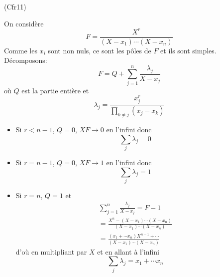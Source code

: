 \begin{tiny}(Cfr11)\end{tiny} On considère
\begin{displaymath}
  F = \frac{X^r}{(X-x_1)\cdots(X-x_n)}
\end{displaymath}
Comme les $x_i$ sont non nuls, ce sont les pôles de $F$ et ils sont simples. Décomposons: 
\begin{displaymath}
F = Q + \sum_{j=1}^n \frac{\lambda_j}{X-x_j}
\end{displaymath}
où $Q$ est la partie entière et 
\begin{displaymath}
  \lambda_j = \frac{x_j^r}{\prod_{k\neq j} (x_j - x_k)}
\end{displaymath}
\begin{itemize}
  \item Si $r<n-1$, $Q=0$, $XF \rightarrow 0$ en l'infini donc
  \begin{displaymath}
    \sum_j \lambda_j = 0
  \end{displaymath}
  \item Si $r=n-1$, $Q=0$, $XF \rightarrow 1$ en l'infini donc
  \begin{displaymath}
    \sum_j \lambda_j = 1
  \end{displaymath}
  \item Si $r=n$, $Q=1$ et
\begin{multline*}
\sum_{j=1}^n \frac{\lambda_j}{X-x_j} = F -1 \\
= \frac{X^n -(X-x_1)\cdots(X-x_n)}{(X-x_1)\cdots(X-x_n)}\\
= \frac{(x_1+\cdots x_n)X^{n-1} + \cdots }{(X-x_1)\cdots(X-x_n)}
\end{multline*}
d'où en multipliant par $X$ et en allant à l'infini
\begin{displaymath}
  \sum_j \lambda_j = x_1+\cdots x_n
\end{displaymath}

\end{itemize}
